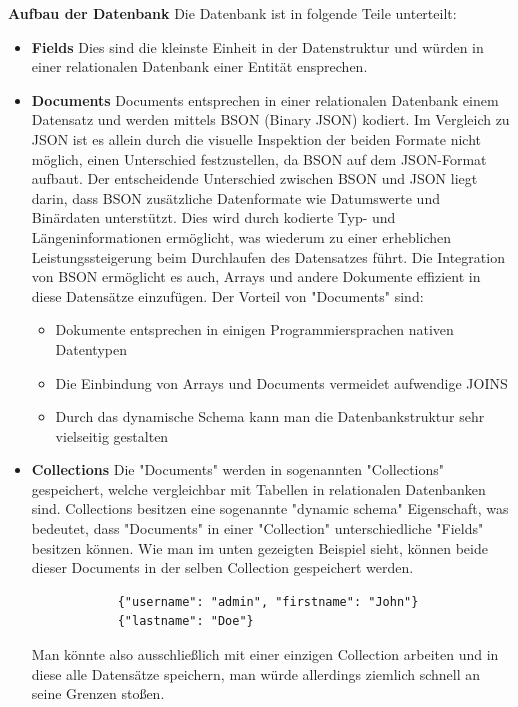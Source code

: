 \textbf{Aufbau der Datenbank}
\newline
Die Datenbank ist in folgende Teile unterteilt:

\begin{itemize}
    \item \textbf{Fields}
        \newline
        Dies sind die kleinste Einheit in der Datenstruktur und würden in einer relationalen Datenbank einer Entität ensprechen.
    \item \textbf{Documents}
        \newline
        Documents entsprechen in einer relationalen Datenbank einem Datensatz und werden mittels BSON (Binary JSON) kodiert. Im Vergleich zu JSON ist es allein durch die visuelle Inspektion der beiden Formate nicht möglich, einen Unterschied festzustellen, da BSON auf dem JSON-Format aufbaut.
        \newline
        Der entscheidende Unterschied zwischen BSON und JSON liegt darin, dass BSON zusätzliche Datenformate wie Datumswerte und Binärdaten unterstützt. Dies wird durch kodierte Typ- und Längeninformationen ermöglicht, was wiederum zu einer erheblichen Leistungssteigerung beim Durchlaufen des Datensatzes führt. Die Integration von BSON ermöglicht es auch, Arrays und andere Dokumente effizient in diese Datensätze einzufügen.
        \newline
        Der Vorteil von "Documents" sind:
        \begin{itemize}
            \item Dokumente entsprechen in einigen Programmiersprachen nativen Datentypen
            \item Die Einbindung von Arrays und Documents vermeidet aufwendige JOINS
            \item Durch das dynamische Schema kann man die Datenbankstruktur sehr vielseitig gestalten
        \end{itemize}
        \cite{mongodb_json_vs_bson}
    \item \textbf{Collections}
        \newline
        Die "Documents" werden in sogenannten "Collections" gespeichert, welche vergleichbar mit Tabellen in relationalen Datenbanken sind. Collections besitzen eine sogenannte "dynamic schema" Eigenschaft, was bedeutet, dass "Documents" in einer "Collection" unterschiedliche "Fields" besitzen können. Wie man im unten gezeigten Beispiel sieht, können beide dieser Documents in der selben Collection gespeichert werden.
        \begin{lstlisting}
            {"username": "admin", "firstname": "John"}
            {"lastname": "Doe"}
        \end{lstlisting}
        Man könnte also ausschließlich mit einer einzigen Collection arbeiten und in diese alle Datensätze speichern, man würde allerdings ziemlich schnell an seine Grenzen stoßen.
        \cite{mongodb_collections}
\end{itemize}


